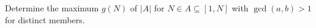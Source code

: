 Determine the maximum $g(N)$ of $|A|$ for $N\in A\subseteq[1,N]$ with $\gcd(a,b)>1$ for distinct members.
